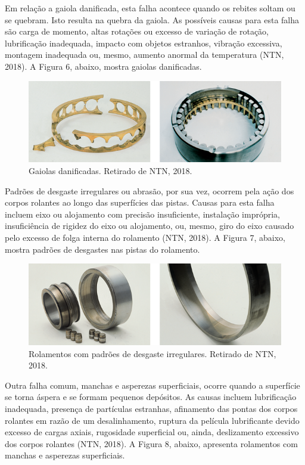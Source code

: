 \documentclass[
	12pt,				
	oneside,			
	a4paper,			
	english,			
	brazil				
	]{abntex2ppgsi}
\begin{document}
Em relação a gaiola danificada, esta falha acontece quando os rebites  soltam ou se quebram. Isto resulta na quebra da gaiola. As possíveis causas para esta falha são carga de momento, altas rotações ou excesso de variação de rotação, lubrificação inadequada, impacto com objetos estranhos, vibração excessiva, montagem inadequada ou, mesmo, aumento anormal da temperatura (NTN, 2018). A Figura 6, abaixo, mostra gaiolas danificadas. 

\begin{figure}[!htb]
\centering
\includegraphics{Figura6}
\caption {Gaiolas danificadas. Retirado de NTN, 2018.}
\label{Figura6}
\end{figure}

Padrões de desgaste irregulares ou abrasão, por sua vez, ocorrem pela ação dos corpos rolantes ao longo das superfícies das pistas. Causas para esta falha incluem eixo ou alojamento com precisão insuficiente, instalação imprópria, insuficiência de rigidez do eixo ou alojamento, ou, mesmo, giro do eixo causado pelo excesso de folga interna do rolamento (NTN, 2018). A Figura 7, abaixo, mostra padrões de desgastes nas pistas do rolamento.

\begin{figure}[!htb]
\centering
\includegraphics{Figura7}
\caption {Rolamentos com padrões de desgaste irregulares. Retirado de NTN, 2018.}
\label{Figura7}
\end{figure}

Outra falha comum, manchas e asperezas superficiais, ocorre quando a superfície se torna áspera e se formam pequenos depósitos. As causas incluem lubrificação inadequada, presença de partículas estranhas, afinamento das pontas dos corpos rolantes em razão de um desalinhamento, ruptura da película lubrificante devido excesso de cargas axiais, rugosidade superficial ou, ainda, deslizamento excessivo dos corpos rolantes (NTN, 2018). A Figura 8, abaixo, apresenta rolamentos com manchas e asperezas superficiais.
\end{document}
